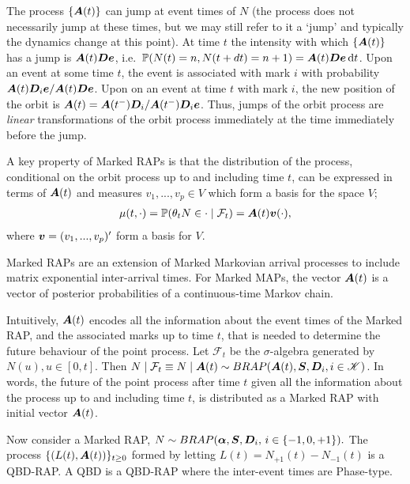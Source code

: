 The process \(\{\boldsymbol A(t)\}\) can jump at event times of \(N\) (the process does not necessarily jump at these times, but we may still refer to it a `jump' and typically the dynamics change at this point). At time \(t\) the intensity with which \(\{\boldsymbol A(t)\}\) has a jump is \(\boldsymbol A(t) \boldsymbol D\boldsymbol e\), i.e.~\(\mathbb P(N(t)=n,N(t+dt)=n+1)=\boldsymbol A(t) \boldsymbol D\boldsymbol e\, \mathrm{d} t\). Upon an event at some time \(t\), the event is associated with mark \(i\) with probability \(\boldsymbol A(t) \boldsymbol D_i\boldsymbol e/\boldsymbol A(t) \boldsymbol D\boldsymbol e\). Upon on an event at time \(t\) with mark \(i\), the new position of the orbit is \(\boldsymbol A(t) = \boldsymbol A(t^-) \boldsymbol D_i/\boldsymbol A(t^-) \boldsymbol D_i\boldsymbol e\). Thus, jumps of the orbit process are \emph{linear} transformations of the orbit process immediately at the time immediately before the jump. 

A key property of Marked RAPs is that the distribution of the process, conditional on the orbit process up to and including time \(t\), can be expressed in terms of \(\boldsymbol A(t)\) and measures \(v_1,...,v_p\in V\) which form a basis for the space \(V\); 
\begin{align}\label{eqn: rapproperty}
	\mu(t,\cdot)=\mathbb P(\theta_tN\in \cdot\mid \mathcal F_t)=\boldsymbol A(t)\boldsymbol v(\cdot),
\end{align}
where \(\boldsymbol v=(v_1,...,v_p)'\) form a basis for \(V\). 

Marked RAPs are an extension of Marked Markovian arrival processes to include matrix exponential inter-arrival times. For Marked MAPs, the vector \(\boldsymbol A(t)\) is a vector of posterior probabilities of a continuous-time Markov chain. 

Intuitively, \(\boldsymbol A(t)\) encodes all the information about the event times of the Marked RAP, and the associated marks up to time \(t\), that is needed to determine the future behaviour of the point process. Let \(\mathcal F_{t}\) be the \(\sigma\)-algebra generated by \(N(u), u\in[0,t]\). Then \(N\mid \mathcal F_t \equiv N\mid \boldsymbol A(t) \sim BRAP(\boldsymbol A(t), \boldsymbol S, \boldsymbol D_i,i\in\mathscr K)\). In words, the future of the point process after time \(t\) given all the information about the process up to and including time \(t\), is distributed as a Marked RAP with initial vector \(\boldsymbol A(t)\). 

Now consider a Marked RAP, \(N\sim BRAP(\boldsymbol \alpha, \boldsymbol S, \boldsymbol D_i,\,i\in\{-1,0,+1\}).\) The process \(\{(L(t),\boldsymbol A(t))\}_{t\geq0}\) formed by letting \(L(t) = N_{+1}(t) - N_{-1}(t)\) is a QBD-RAP. A QBD is a QBD-RAP where the inter-event times are Phase-type.


